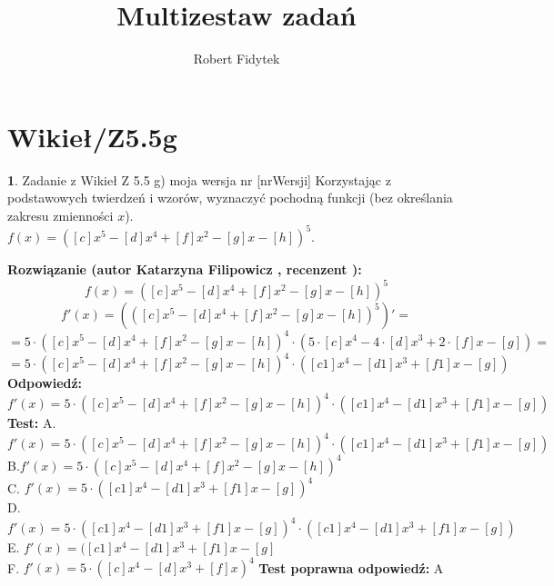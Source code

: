\documentclass[12pt, a4paper]{article}
\title{Multizestaw zadań}
\author{Robert Fidytek}
\date{}
\theoremstyle{definition} %
\newtheorem{zad}{}
\newcommand{\kategoria}[1]{\section{#1}} %
\newcommand{\zadStart}[1]{\begin{zad}#1\newline} %
\newcommand{\zadStop}{\end{zad}}   %
\newcommand{\rozwStart}[2]{\noindent \textbf{Rozwiązanie (autor #1 , recenzent #2): }\newline} %
\newcommand{\rozwStop}{\newline}                                            %
\newcommand{\odpStart}{\noindent \textbf{Odpowiedź:}\newline}    %
\newcommand{\odpStop}{\newline}                                             %
\newcommand{\testStart}{\noindent \textbf{Test:}\newline} %
\newcommand{\testStop}{\newline} %
\newcommand{\kluczStart}{\noindent \textbf{Test poprawna odpowiedź:}\newline} %
\newcommand{\kluczStop}{\newline} %
\begin{document}
\maketitle


\kategoria{Wikieł/Z5.5g}
\zadStart{Zadanie z Wikieł Z 5.5 g) moja wersja nr [nrWersji]}
Korzystając z podstawowych twierdzeń i wzorów, wyznaczyć pochodną funkcji (bez określania zakresu zmienności $x$).\\
$f(x)=([c]x^5-[d]x^4+[f]x^2-[g]x-[h])^5$.
\zadStop
\rozwStart{Katarzyna Filipowicz}{}
$$f(x)=([c]x^5-[d]x^4+[f]x^2-[g]x-[h])^5$$
$$f'(x)=(([c]x^5-[d]x^4+[f]x^2-[g]x-[h])^5)' = $$
$$ =5\cdot ([c]x^5-[d]x^4+[f]x^2-[g]x-[h])^4\cdot( 5\cdot [c]x^4-4 \cdot [d]x^3+ 2\cdot [f]x-[g] )= $$
$$ = 5\cdot ([c]x^5-[d]x^4+[f]x^2-[g]x-[h])^4\cdot( [c1]x^4- [d1]x^3+ [f1]x-[g] )$$
\rozwStop
\odpStart
$ f'(x)=5\cdot ([c]x^5-[d]x^4+[f]x^2-[g]x-[h])^4\cdot( [c1]x^4- [d1]x^3+ [f1]x-[g] )$
\odpStop
\testStart
A.$ f'(x)=5\cdot ([c]x^5-[d]x^4+[f]x^2-[g]x-[h])^4\cdot( [c1]x^4- [d1]x^3+ [f1]x-[g] ) $\\
B.$ f'(x)=5\cdot ([c]x^5-[d]x^4+[f]x^2-[g]x-[h])^4 $ \\
C. $ f'(x)=5\cdot ( [c1]x^4- [d1]x^3+ [f1]x-[g] )^4 $\\
D. $ f'(x)=5\cdot ( [c1]x^4- [d1]x^3+ [f1]x-[g] )^4\cdot( [c1]x^4- [d1]x^3+ [f1]x-[g] ) $\\
E. $ f'(x)=( [c1]x^4- [d1]x^3+ [f1]x-[g] $\\
F. $ f'(x)=5\cdot ([c]x^4-[d]x^3+[f]x)^4$
\testStop
\kluczStart
A
\kluczStop
\end{document}
